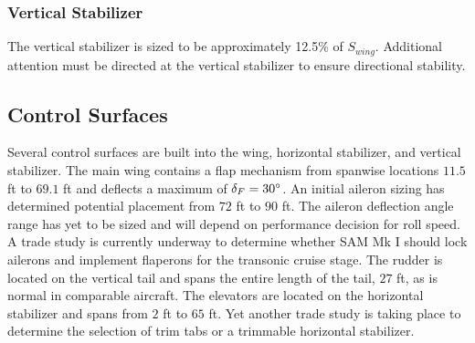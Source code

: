\subsubsection{Vertical Stabilizer}
The vertical stabilizer is sized to be approximately 12.5\% of $S_{wing}$.  Additional attention must be directed at the vertical stabilizer to ensure directional stability.

\subsection{Control Surfaces}
Several control surfaces are built into the wing, horizontal stabilizer, and vertical stabilizer.  The main wing contains a flap mechanism from spanwise locations $11.5$ ft to $69.1$ ft and deflects a maximum of $\delta_F = 30\degree$.  An initial aileron sizing has determined potential placement from $72$ ft to $90$ ft.  The aileron deflection angle range has yet to be sized and will depend on performance decision for roll speed.  A trade study is currently underway to determine whether SAM Mk I should lock ailerons and implement flaperons for the transonic cruise stage.  The rudder is located on the vertical tail and spans the entire length of the tail, $27$ ft, as is normal in comparable aircraft.  The elevators are located on the horizontal stabilizer and spans from $2$ ft to $65$ ft.  Yet another trade study is taking place to determine the selection of trim tabs or a trimmable horizontal stabilizer.

\clearpage






